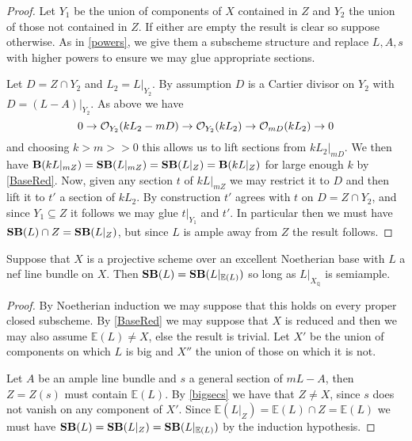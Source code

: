 \begin{proof}
	Let $Y_{1}$ be the union of components of $X$ contained in $Z$ and $Y_{2}$ the union of those not contained in $Z$. If either are empty the result is clear so suppose otherwise. As in \autoref{powers}, we give them a subscheme structure and replace $L,A,s$ with higher powers to ensure we may glue appropriate sections.
	
	Let $D=Z \cap Y_{2}$ and $L_{2}=L|_{Y_{2}}$. By assumption $D$ is a Cartier divisor on $Y_{2}$ with $D=(L-A)|_{Y_{2}}$. As above we have 
	\[0 \to \ox[Y_{2}] (kL_{2}-mD) \to \ox[Y_{2}](kL_{2}) \to \ox[mD](kL_{2}) \to 0\]
	and choosing $k > m >>0$ this allows us to lift sections from $kL_{2}|_{mD}$. We then have $\BB(kL|_{mZ})=\SB(L|_{mZ})=\SB(L|_{Z})= \BB(kL|_{Z})$ for large enough $k$ by \autoref{BaseRed}. Now, given any section $t$ of $kL|_{mZ}$ we may restrict it to $D$ and then lift it to $t'$ a section of $kL_{2}$. By construction $t'$ agrees with $t$ on $D=Z \cap Y_{2}$, and since $Y_{1} \subseteq Z$ it follows we may glue $t|_{Y_{1}}$ and $t'$. In particular then we must have $\SB(L)\cap Z = \SB(L|_{Z})$, but since $L$ is ample away from $Z$ the result follows.
\end{proof}


\begin{corollary}\label{Main_Loci2}
	Suppose that $X$ is a projective scheme over an excellent Noetherian base with $L$ a nef line bundle on $X$. Then $\SB(L)=\SB(L|_{\mathbb{E}(L)})$ so long as $L|_{X_{\mathbb{Q}}}$ is semiample.
\end{corollary}
\begin{proof}
	By Noetherian induction we may suppose that this holds on every proper closed subscheme. By \autoref{BaseRed} we may suppose that $X$ is reduced and then we may also assume $\mathbb{E}(L) \neq X$, else the result is trivial. Let $X'$ be the union of components on which $L$ is big and $X''$ the union of those on which it is not.
	
	Let $A$ be an ample line bundle and $s$ a general section of $mL-A$, then $Z=Z(s)$ must contain $\mathbb{E}(L)$. By \autoref{bigsecs} we have that $Z \neq X$, since $s$ does not vanish on any component of $X'$. Since $\mathbb{E}(L|_{Z}) = \mathbb{E}(L)\cap Z= \mathbb{E}(L)$ we must have $\SB(L)=\SB(L|_{Z})=\SB(L|_{\mathbb{E}(L)})$ by the induction hypothesis. 
\end{proof}



